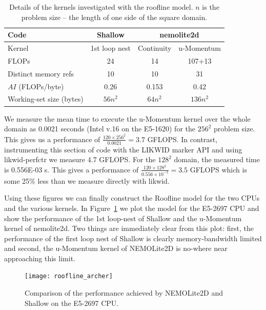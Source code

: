 \documentclass[12pt]{article}
\begin{document}
\begin{table}
\begin{tabular}{|l|c|c|c|}
\hline
Code                       & Shallow & \multicolumn{2}{c|}{nemolite2d} \\
\hline
Kernel                     & 1st loop nest & Continuity & u-Momentum \\
\hline                                
FLOPs                      & 24      &    14      &   107+13   \\
Distinct memory refs       & 10      &    10      &   31       \\
$AI$ (FLOPs/byte)          & 0.26    &  0.153     &   0.42     \\
Working-set size (bytes)   & $56n^2$ &  $64n^2$   &   $136n^2$ \\
\hline
\end{tabular}
\caption{Details of the kernels investigated with the roofline
  model. $n$ is the problem size -- the length of one side of the
  square domain.}
\label{TAB_kernel_details}
\end{table}

We measure the mean time to execute the u-Momentum kernel over the
whole domain as 0.0021 seconds (Intel v.16 on the E5-1620) for the
$256^2$ problem size. This gives us a performance of
$\frac{120\times 256^2}{0.0021} = 3.7$ GFLOPS. In contrast, instrumenting
this section of code with the LIKWID marker API and using
likwid-perfctr we measure 4.7 GFLOPS.
For the $128^2$ domain, the measured time is 0.556E-03 s. This gives a
performance of $\frac{120\times 128^2}{0.556\times10^{-3}} = 3.5$
GFLOPS which is some 25\% less than we measure directly with likwid.

Using these figures we can finally construct the Roofline model for
the two CPUs and the various kernels. In
Figure~\ref{FIG_roofline_archer} we plot the model for the E5-2697 CPU
and show the performance of the 1st loop-nest of Shallow and the
u-Momentum kernel of nemolite2d. Two things are immediately clear from
this plot: first, the performance of the first loop nest of Shallow is
clearly memory-bandwidth limited and second, the u-Momentum kernel of
NEMOLite2D is no-where near approaching this limit.

\begin{figure}
\centering
\texttt{[image: roofline\_archer]}
\caption{Comparison of the performance achieved by NEMOLite2D and
  Shallow on the E5-2697 CPU.}
\label{FIG_roofline_archer}
\end{figure}
\end{document}
